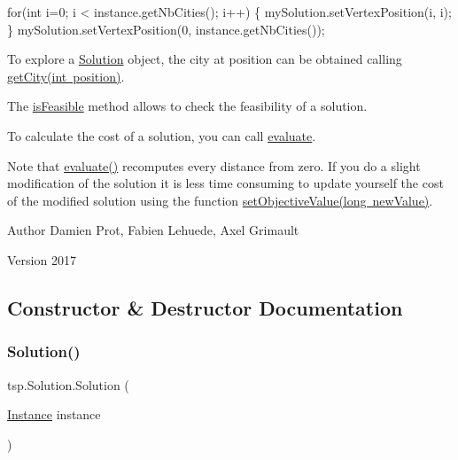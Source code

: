 \begin{DoxyCode}
\textcolor{keywordflow}{for}(\textcolor{keywordtype}{int} i=0; i < instance.getNbCities(); i++)
\{
    mySolution.setVertexPosition(i, i);
\}
mySolution.setVertexPosition(0, instance.getNbCities());
\end{DoxyCode}


To explore a \mbox{\hyperlink{classtsp_1_1_solution}{Solution}} object, the city at position can be obtained calling \mbox{\hyperlink{classtsp_1_1_solution_a591955a31b69922e07c98958ab129f90}{get\+City(int position)}}.

The \mbox{\hyperlink{classtsp_1_1_solution_a93a7045acd93ccac25da9c471618f9bc}{is\+Feasible}} method allows to check the feasibility of a solution.

To calculate the cost of a solution, you can call \mbox{\hyperlink{classtsp_1_1_solution_aab96d9400180cc1854a1a48b848f92a4}{evaluate}}.

Note that \mbox{\hyperlink{classtsp_1_1_solution_aab96d9400180cc1854a1a48b848f92a4}{evaluate()}} recomputes every distance from zero. If you do a slight modification of the solution it is less time consuming to update yourself the cost of the modified solution using the function \mbox{\hyperlink{classtsp_1_1_solution_a5cff3a62643a336a021da631afd9f9cb}{set\+Objective\+Value(long new\+Value)}}.

\begin{DoxyAuthor}{Author}
Damien Prot, Fabien Lehuede, Axel Grimault 
\end{DoxyAuthor}
\begin{DoxyVersion}{Version}
2017 
\end{DoxyVersion}


\subsection{Constructor \& Destructor Documentation}
\mbox{\label{classtsp_1_1_solution_a1d6b0b25fa67c11755bb5f753c610fa1}} 
\subsubsection{\texorpdfstring{Solution()}{Solution()}}
{\footnotesize\ttfamily tsp.\+Solution.\+Solution (\begin{DoxyParamCaption}\item[{\mbox{\hyperlink{classtsp_1_1_instance}{Instance}}}]{instance }\end{DoxyParamCaption})\hspace{0.3cm}{\ttfamily [inline]}}

